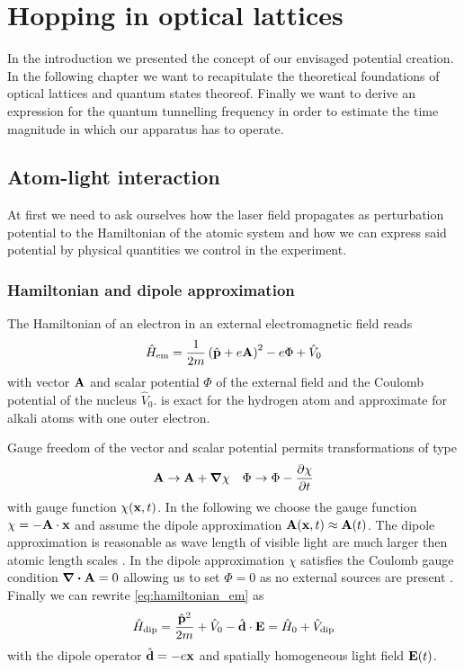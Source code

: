 \chapter{Hopping in optical lattices}

In the introduction we presented the concept of our envisaged potential
creation. In the following chapter we want to recapitulate the theoretical
foundations of optical lattices and quantum states theoreof. Finally we want
to derive an expression for the quantum tunnelling frequency in order to
estimate the time magnitude in which our apparatus has to operate.

\section{Atom-light interaction}

At first we need to ask ourselves how the laser field propagates as
perturbation potential to the Hamiltonian of the atomic system and how we can
express said potential by physical quantities we control in the experiment.

\subsection{Hamiltonian and dipole approximation}

The Hamiltonian of an electron in an external electromagnetic field reads
\begin{equation}
  \hat{H}_\text{em}
  =\frac{1}{2m}\left(\hat{\vb{p}}+e\vb{A}\right)^2-e\Phi+\hat{V}_0
  \label{eq:hamiltonian_em}
\end{equation}
with vector $\vb{A}$ and scalar potential $\Phi$ of the external field and
the Coulomb potential of the nucleus $\hat{V}_0$.  is
exact for the hydrogen atom and approximate for alkali atoms with one outer
electron.

Gauge freedom of the vector and scalar potential permits transformations of
type
\begin{align}
  \vb{A}\to\vb{A}+\grad{\chi}
  &&
  \Phi\to\Phi-\pdv{\chi}{t}
\end{align}
with gauge function $\chi(\vb{x},t)$. In the following we choose the gauge
function $\chi=-\vb{A}\cdot\vb{x}$ and assume the dipole approximation
$\vb{A}(\vb{x},t)\approx\vb{A}(t)$. The dipole approximation is reasonable as
wave length of visible light are much larger then atomic length scales
\cite{Gerry2004}. In the dipole approximation $\chi$ satisfies the Coulomb
gauge condition $\divergence{\vb{A}}=0$ allowing us to set $\Phi=0$ as no
external sources are present \cite{Jackson2005}. Finally we can rewrite
\cref{eq:hamiltonian_em} as
\begin{equation}
  \hat{H}_\text{dip}
  =\frac{\hat{\vb{p}}^2}{2m}+\hat{V}_0-\hat{\vb{d}}\cdot\vb{E}
  =\hat{H}_0+\hat{V}_\text{dip}
  \label{eq:hamiltonian_dip}
\end{equation}
with the dipole operator $\hat{\vb{d}}=-e\vb{x}$ and spatially homogeneous
light field $\vb{E}(t)$.

